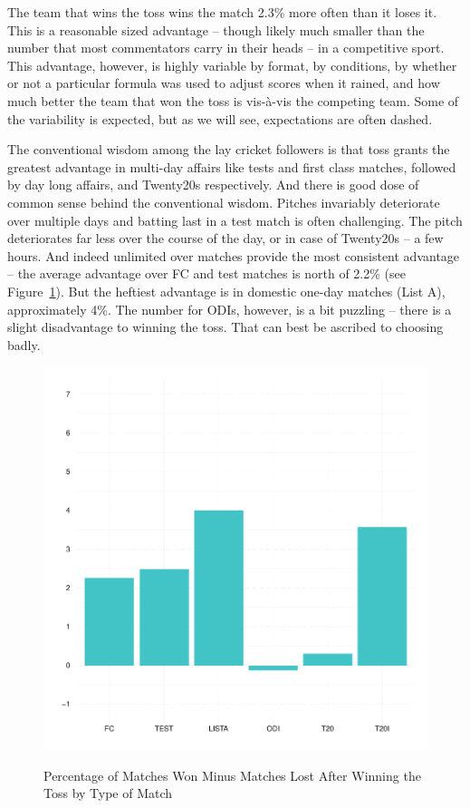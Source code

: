 \documentclass[11pt]{article}
\begin{document}
The team that wins the toss wins the match 2.3\% more often than it loses it. This is a reasonable sized advantage -- though likely much smaller than the number that most commentators carry in their heads -- in a competitive sport. This advantage, however, is highly variable by format, by conditions, by whether or not a particular formula was used to adjust scores when it rained, and how much better the team that won the toss is vis-\`{a}-vis the competing team. Some of the variability is expected, but as we will see, expectations are often dashed. 

The conventional wisdom among the lay cricket followers is that toss grants the greatest advantage in multi-day affairs like tests and first class matches, followed by day long affairs, and Twenty20s respectively. And there is good dose of common sense behind the conventional wisdom. Pitches invariably deteriorate over multiple days and batting last in a test match is often challenging. The pitch deteriorates far less over the course of the day, or in case of Twenty20s -- a few hours. And indeed unlimited over matches provide the most consistent advantage -- the average advantage over FC and test matches is north of 2.2\% (see Figure~\ref{fig:type}). But the heftiest advantage is in domestic one-day matches (List A), approximately 4\%. The number for ODIs, however, is a bit puzzling -- there is a slight disadvantage to winning the toss. That can best be ascribed to choosing badly.      

\begin{figure}[htbp]
\centering
\caption{Percentage of Matches Won Minus Matches Lost After Winning the Toss by Type of Match}
\includegraphics[scale=.85]{../figs/winbyType.pdf}
\label{fig:type}
\end{figure}
\end{document}
